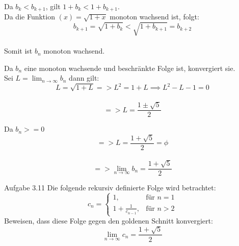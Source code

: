 \documentclass{beamer}
\begin{document}
\begin{frame}
    Da $ b_k < b_{k+1} $, gilt $ 1 + b_k < 1 + b_{k+1} .$  \\
    Da die Funktion $(x) = \sqrt{1 + x}$ monoton wachsend ist, folgt:  \\
$$
b_{k+1} = \sqrt{1 + b_k} < \sqrt{1 + b_{k+1}} = b_{k+2}
$$ \\
    Somit ist $ b_n $ monoton wachsend.
\end{frame}

\begin{frame}
Da $b_n$ eine monoton wachsende und beschränkte Folge ist, konvergiert sie.  \\

Sei $L = \lim_{n \to \infty} b_n $ dann gilt: \\
$$
L = \sqrt{1 + L} => L^2 = 1 + L \implies L^2 - L - 1 = 0 
$$ \\
$$
=> L = \frac{1 \pm \sqrt{5}}{2}
$$

\end{frame}

\begin{frame}
Da $ b_n >= 0$ %
   $$
=> L = \frac{1 + \sqrt{5}}{2} = \phi 
$$  \\
$$
=> \lim_{n \to \infty} b_n = \frac{1 + \sqrt{5}}{2}
$$

\end{frame}

\begin{frame}{Aufgabe 3.11}
    Die folgende rekursiv definierte Folge wird betrachtet:
    \[
    c_n = 
    \begin{cases}
        1, & \text{für } n = 1 \\
        1 + \frac{1}{c_{n-1}}, & \text{für } n > 2
    \end{cases}
    \]
    \bigskip
    Beweisen, dass diese Folge gegen den goldenen Schnitt konvergiert:
    \[
    \lim_{n \to \infty} c_n = \frac{1 + \sqrt{5}}{2}
    \]
\end{frame}
\end{document}
